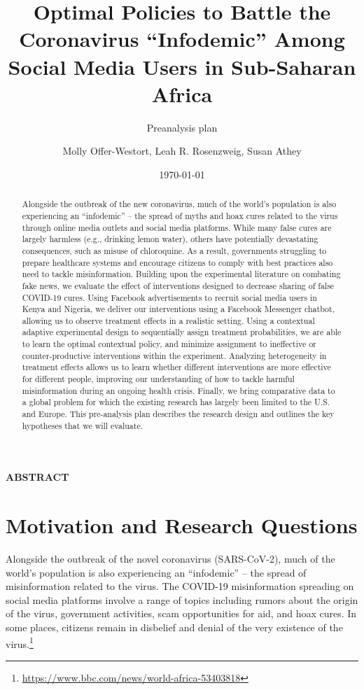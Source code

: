 \documentclass[letterpaper, 12pt, parskip=full,]{scrartcl}
\title{Optimal Policies to Battle the Coronavirus ``Infodemic'' Among Social Media Users in Sub-Saharan Africa}
\subtitle{Preanalysis plan}
\author{Molly Offer-Westort, Leah R. Rosenzweig, Susan Athey}
\date{\today}
\begin{document}
%
\normalsize%
\maketitle%
\tableofcontents%
\clearpage%


\centerline{\textbf{ABSTRACT}}
\begin{abstract}
Alongside the outbreak of the new coronavirus, much of the world’s population is also experiencing an “infodemic” -- the spread of myths and hoax cures related to the virus through online media outlets and social media platforms. While many false cures are largely harmless (e.g., drinking lemon water), others have potentially devastating consequences, such as misuse of chloroquine. As a result, governments struggling to prepare healthcare systems and encourage citizens to comply with best practices also need to tackle misinformation. Building upon the experimental literature on combating fake news, we evaluate the effect of interventions designed to decrease sharing of false COVID-19 cures. Using Facebook advertisements to recruit social media users in Kenya and Nigeria, we deliver our interventions using a Facebook Messenger chatbot, allowing us to observe treatment effects in a realistic setting. Using a contextual adaptive experimental design to sequentially assign treatment probabilities, we are able to learn the optimal contextual policy, and minimize assignment to ineffective or counter-productive interventions within the experiment. Analyzing heterogeneity in treatment effects allows us to learn whether different interventions are more effective for different people, improving our understanding of how to tackle harmful misinformation during an ongoing health crisis. Finally, we bring comparative data to a global problem for which the existing research has largely been limited to the U.S. and Europe. This pre-analysis plan describes the research design and outlines the key hypotheses that we will evaluate.
\end{abstract}





\section{Motivation and Research Questions}

Alongside the outbreak of the novel coronavirus (SARS-CoV-2), much of the world's population is also experiencing an ``infodemic'' -- the spread of misinformation related to the virus. The COVID-19 misinformation spreading on social media platforms involve a range of topics including rumors about the origin of the virus, government activities, scam opportunities for aid, and hoax cures. In some places, citizens remain in disbelief and denial of the very existence of the virus.\footnote{\url{https://www.bbc.com/news/world-africa-53403818}} 
\end{document}

